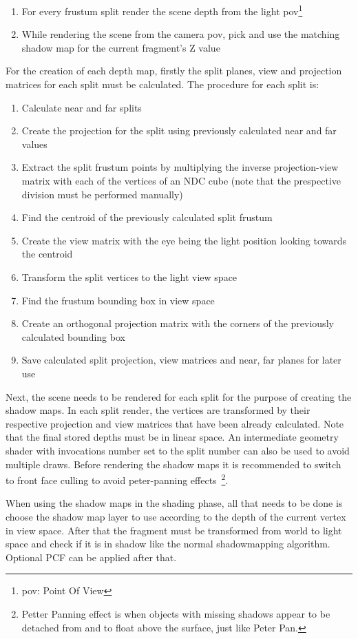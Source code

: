 \begin{enumerate}
\item For every frustum split render the scene depth from the light pov\footnote{pov: Point Of View}
\item While rendering the scene from the camera pov, pick and use the matching shadow map for the current
    fragment's Z value
\end{enumerate}

For the creation of each depth map, firstly the split planes, view and projection matrices for each split
must be calculated. The procedure for each split is:

\begin{enumerate}
\item Calculate near and far splits
\item Create the projection for the split using previously calculated near and far values
\item Extract the split frustum points by multiplying the inverse projection-view matrix
    with each of the vertices of an NDC cube (note that the prespective division must
    be performed manually)
\item Find the centroid of the previously calculated split frustum
\item Create the view matrix with the eye being the light position looking towards the centroid
\item Transform the split vertices to the light view space
\item Find the frustum bounding box in view space
\item Create an orthogonal projection matrix with the corners of the previously calculated bounding box
\item Save calculated split projection, view matrices and near, far planes for later use
\end{enumerate}

Next, the scene needs to be rendered for each split for the purpose of creating the shadow maps.
In each split render, the vertices are transformed by their respective projection and view matrices
that have been already calculated. Note that the final stored depths must be in linear space.
An intermediate geometry shader with invocations number set to the split number can also be used
to avoid multiple draws. Before rendering the shadow maps it is recommended to switch to front
face culling to avoid peter-panning effects~\footnote{Petter Panning effect is when objects with missing shadows
appear to be detached from and to float above the surface, just like Peter Pan.}.

When using the shadow maps in the shading phase, all that needs to be done is choose the shadow
map layer to use according to the depth of the current vertex in view space. After that
the fragment must be transformed from world to light space and check if it is in shadow like
the normal shadowmapping algorithm. Optional PCF can be applied after that.
